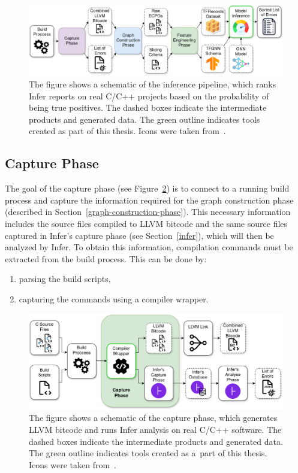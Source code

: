 \begin{figure}[t]
	\centering
	\includegraphics[width=1\textwidth]{figures/inference-pipeline.png}
	\caption{The figure shows a schematic of the inference pipeline, which ranks Infer reports on real C/C++ projects based on the probability of being true positives. The dashed boxes indicate the intermediate products and generated data. The green outline indicates tools created as part of this thesis. Icons were taken from~\cite{icon-model, icon-tfrecords, icon-inference}.}
	\label{figure:inference-pipeline}
\end{figure}

\subsection{Capture Phase}
\label{capture-phase}
The goal of the capture phase (see Figure~\ref{figure:capture-phase}) is to connect to a running build process and capture the information required for the graph construction phase (described in Section~\ref{graph-construction-phase}). This necessary information includes the source files compiled to LLVM bitcode and the same source files captured in Infer's capture phase (see Section~\ref{infer}), which will then be analyzed by Infer. To obtain this information, compilation commands must be extracted from the build process. This can be done by:
\begin{enumerate}
    \item parsing the build scripts,
    \item capturing the commands using a compiler wrapper.
\end{enumerate}

\begin{figure}[t]
	\centering
	\includegraphics[width=1\textwidth]{figures/capture-phase.png}
	\caption{The figure shows a schematic of the capture phase, which generates LLVM bitcode and runs Infer analysis on real C/C++ software. The dashed boxes indicate the intermediate products and generated data. The green outline indicates tools created as a~part of this thesis. Icons were taken from~\cite{icon-compiler, infer-web}.}
	\label{figure:capture-phase}
\end{figure}

